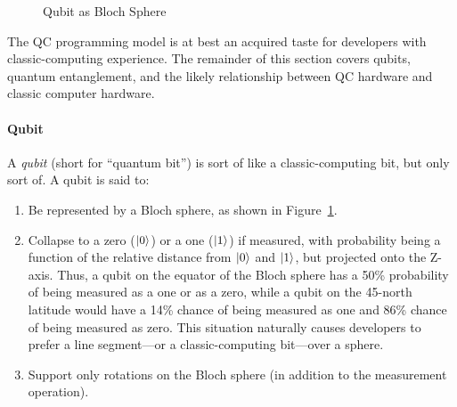 \begin{figure}[tb]
\centering
{}
\caption{Qubit as Bloch Sphere}
\label{fig:future:Qubit as Bloch Sphere}
\end{figure}

The QC programming model is at best an acquired taste for developers
with classic-computing experience.
The remainder of this section covers qubits,
quantum entanglement,
and
the likely relationship between QC hardware and classic computer hardware.

\paragraph{Qubit}

A \emph{qubit} (short for ``quantum bit'') is sort of like a
classic-computing bit, but only sort of.
A qubit is said to:

\begin{enumerate}
\item	Be represented by a Bloch sphere, as shown in
	Figure~\ref{fig:future:Qubit as Bloch Sphere}.
\item	Collapse to a zero ($\ket{0}$) or a one ($\ket{1}$) if measured,
	with probability being a function of the relative distance from
	$\ket{0}$ and $\ket{1}$, but projected onto the Z-axis.
	Thus, a qubit on the equator of the Bloch sphere has a 50\%
	probability of being measured as a one or as a zero, while
	a qubit on the 45\textdegree-north latitude would have
	a 14\% chance of being measured as one and 86\% chance
	of being measured as zero.
	This situation naturally causes developers to prefer a line
	segment---or a classic-computing bit---over a sphere.
\item	Support only rotations on the Bloch sphere (in addition to
	the measurement operation).
\end{enumerate}

